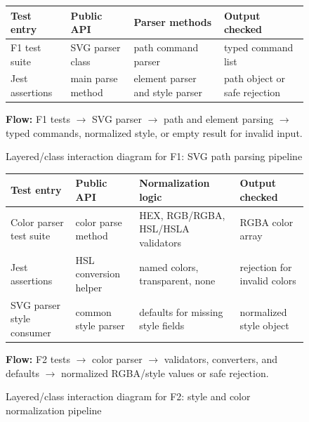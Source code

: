 \begin{figure}[htbp]
\centering
\footnotesize
\renewcommand{\arraystretch}{1.45}
\begin{tabular}{|>{\centering\arraybackslash}p{3.1cm}|>{\centering\arraybackslash}p{3.0cm}|>{\centering\arraybackslash}p{3.0cm}|>{\centering\arraybackslash}p{3.0cm}|}
\hline
\textbf{Test entry} & \textbf{Public API} & \textbf{Parser methods} & \textbf{Output checked} \\
\hline
F1 test suite &
SVG parser class &
path command parser &
typed command list \\
\hline
Jest assertions &
main parse method &
element parser and style parser &
path object or safe rejection \\
\hline
\end{tabular}

\vspace{0.35cm}
\textbf{Flow:}
F1 tests $\rightarrow$ SVG parser $\rightarrow$ path and element parsing $\rightarrow$ typed commands, normalized style, or empty result for invalid input.
\caption{Layered/class interaction diagram for F1: SVG path parsing pipeline}
\label{fig:f1_architecture}
\end{figure}

\begin{figure}[htbp]
\centering
\footnotesize
\renewcommand{\arraystretch}{1.45}
\begin{tabular}{|>{\centering\arraybackslash}p{3.0cm}|>{\centering\arraybackslash}p{3.0cm}|>{\centering\arraybackslash}p{3.3cm}|>{\centering\arraybackslash}p{3.0cm}|}
\hline
\textbf{Test entry} & \textbf{Public API} & \textbf{Normalization logic} & \textbf{Output checked} \\
\hline
Color parser test suite &
color parse method &
HEX, RGB/RGBA, HSL/HSLA validators &
RGBA color array \\
\hline
Jest assertions &
HSL conversion helper &
named colors, transparent, none &
rejection for invalid colors \\
\hline
SVG parser style consumer &
common style parser &
defaults for missing style fields &
normalized style object \\
\hline
\end{tabular}

\vspace{0.35cm}
\textbf{Flow:}
F2 tests $\rightarrow$ color parser $\rightarrow$ validators, converters, and defaults $\rightarrow$ normalized RGBA/style values or safe rejection.
\caption{Layered/class interaction diagram for F2: style and color normalization pipeline}
\label{fig:f2_architecture}
\end{figure}


